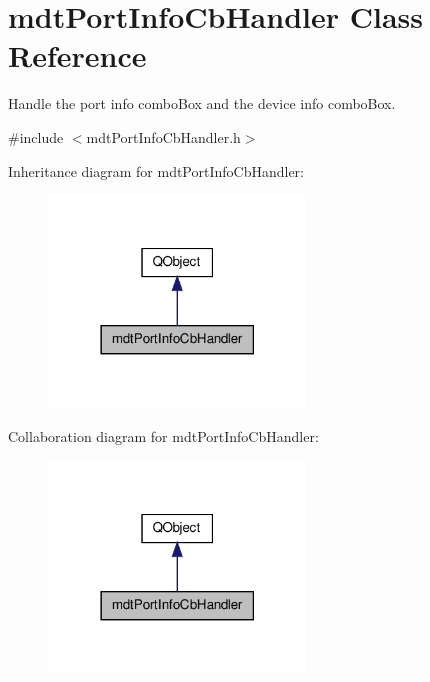 \hypertarget{classmdt_port_info_cb_handler}{\section{mdt\-Port\-Info\-Cb\-Handler Class Reference}
\label{classmdt_port_info_cb_handler}
}


Handle the port info combo\-Box and the device info combo\-Box.  




{\ttfamily \#include $<$mdt\-Port\-Info\-Cb\-Handler.\-h$>$}



Inheritance diagram for mdt\-Port\-Info\-Cb\-Handler\-:\nopagebreak
\begin{figure}[H]
\begin{center}
\leavevmode
\includegraphics[width=194pt]{classmdt_port_info_cb_handler__inherit__graph}
\end{center}
\end{figure}


Collaboration diagram for mdt\-Port\-Info\-Cb\-Handler\-:\nopagebreak
\begin{figure}[H]
\begin{center}
\leavevmode
\includegraphics[width=194pt]{classmdt_port_info_cb_handler__coll__graph}
\end{center}
\end{figure}
